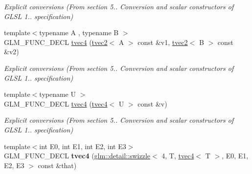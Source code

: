 \begin{DoxyCompactItemize}
\begin{DoxyCompactList}\small\item\em \-Explicit conversions (\-From section 5.. \-Conversion and scalar constructors of \-G\-L\-S\-L 1.. specification) \end{DoxyCompactList}\item 
\hypertarget{structglm_1_1detail_1_1tvec4_aa6fe58d14fcd72305a7290873d6ebebc}{{\footnotesize template$<$typename A , typename B $>$ }\\\-G\-L\-M\-\_\-\-F\-U\-N\-C\-\_\-\-D\-E\-C\-L \hyperlink{structglm_1_1detail_1_1tvec4_aa6fe58d14fcd72305a7290873d6ebebc}{tvec4} (\hyperlink{structglm_1_1detail_1_1tvec2}{tvec2}$<$ \-A $>$ const \&v1, \hyperlink{structglm_1_1detail_1_1tvec2}{tvec2}$<$ \-B $>$ const \&v2)}\label{structglm_1_1detail_1_1tvec4_aa6fe58d14fcd72305a7290873d6ebebc}

\begin{DoxyCompactList}\small\item\em \-Explicit conversions (\-From section 5.. \-Conversion and scalar constructors of \-G\-L\-S\-L 1.. specification) \end{DoxyCompactList}\item 
\hypertarget{structglm_1_1detail_1_1tvec4_a36df281e0c88fd525d62f430e3b97313}{{\footnotesize template$<$typename U $>$ }\\\-G\-L\-M\-\_\-\-F\-U\-N\-C\-\_\-\-D\-E\-C\-L \hyperlink{structglm_1_1detail_1_1tvec4_a36df281e0c88fd525d62f430e3b97313}{tvec4} (\hyperlink{structglm_1_1detail_1_1tvec4}{tvec4}$<$ \-U $>$ const \&v)}\label{structglm_1_1detail_1_1tvec4_a36df281e0c88fd525d62f430e3b97313}

\begin{DoxyCompactList}\small\item\em \-Explicit conversions (\-From section 5.. \-Conversion and scalar constructors of \-G\-L\-S\-L 1.. specification) \end{DoxyCompactList}\item 
\hypertarget{structglm_1_1detail_1_1tvec4_ab6f537fb6207aaefb6dc098ad4b78e93}{{\footnotesize template$<$int \-E0, int \-E1, int \-E2, int \-E3$>$ }\\\-G\-L\-M\-\_\-\-F\-U\-N\-C\-\_\-\-D\-E\-C\-L {\bfseries tvec4} (\hyperlink{structglm_1_1detail_1_1swizzle}{glm\-::detail\-::swizzle}$<$ 4, \-T, \hyperlink{structglm_1_1detail_1_1tvec4}{tvec4}$<$ \-T $>$, \-E0, \-E1, \-E2, \-E3 $>$ const \&that)}\label{structglm_1_1detail_1_1tvec4_ab6f537fb6207aaefb6dc098ad4b78e93}


\end{DoxyCompactItemize}

